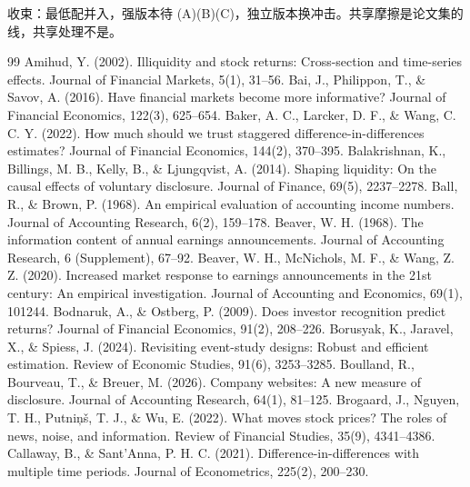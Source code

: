\documentclass[a4paper,11pt]{ctexart}
\begin{document}
收束：最低配并入，强版本待 (A)(B)(C)，独立版本换冲击。共享摩擦是论文集的线，共享处理不是。
\clearpage
\clearpage
\begin{thebibliography}{99}
\setlength{\itemsep}{0.3em}
 Amihud, Y. (2002). Illiquidity and stock returns: Cross-section and time-series effects. Journal of Financial Markets, 5(1), 31–56.
 Bai, J., Philippon, T., \& Savov, A. (2016). Have financial markets become more informative? Journal of Financial Economics, 122(3), 625–654.
 Baker, A. C., Larcker, D. F., \& Wang, C. C. Y. (2022). How much should we trust staggered difference-in-differences estimates? Journal of Financial Economics, 144(2), 370–395.
 Balakrishnan, K., Billings, M. B., Kelly, B., \& Ljungqvist, A. (2014). Shaping liquidity: On the causal effects of voluntary disclosure. Journal of Finance, 69(5), 2237–2278.
 Ball, R., \& Brown, P. (1968). An empirical evaluation of accounting income numbers. Journal of Accounting Research, 6(2), 159–178.
 Beaver, W. H. (1968). The information content of annual earnings announcements. Journal of Accounting Research, 6 (Supplement), 67–92.
 Beaver, W. H., McNichols, M. F., \& Wang, Z. Z. (2020). Increased market response to earnings announcements in the 21st century: An empirical investigation. Journal of Accounting and Economics, 69(1), 101244.
 Bodnaruk, A., \& Ostberg, P. (2009). Does investor recognition predict returns? Journal of Financial Economics, 91(2), 208–226.
 Borusyak, K., Jaravel, X., \& Spiess, J. (2024). Revisiting event-study designs: Robust and efficient estimation. Review of Economic Studies, 91(6), 3253–3285.
 Boulland, R., Bourveau, T., \& Breuer, M. (2026). Company websites: A new measure of disclosure. Journal of Accounting Research, 64(1), 81–125.
 Brogaard, J., Nguyen, T. H., Putniņš, T. J., \& Wu, E. (2022). What moves stock prices? The roles of news, noise, and information. Review of Financial Studies, 35(9), 4341–4386.
 Callaway, B., \& Sant'Anna, P. H. C. (2021). Difference-in-differences with multiple time periods. Journal of Econometrics, 225(2), 200–230.

\end{thebibliography}
\end{document}
